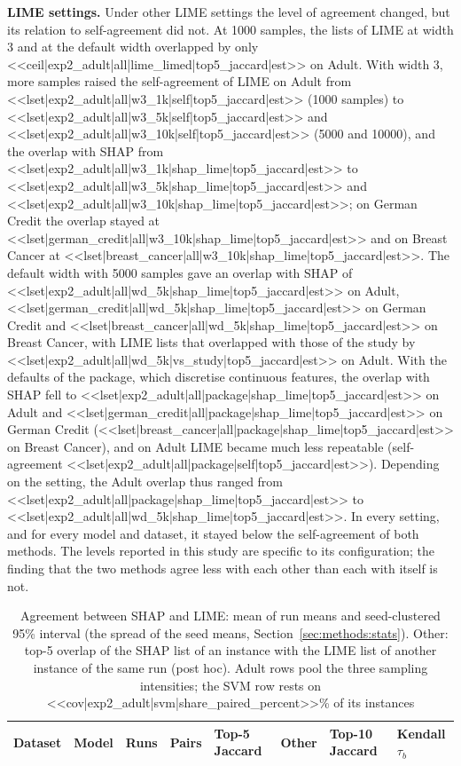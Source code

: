 \textbf{LIME settings.} Under other LIME settings the level of agreement changed, but its
relation to self-agreement did not. At 1000 samples, the lists of LIME at width 3 and at the
default width overlapped by only <<ceil|exp2_adult|all|lime_limed|top5_jaccard|est>> on
Adult. With width 3, more samples raised the self-agreement of LIME on Adult from
<<lset|exp2_adult|all|w3_1k|self|top5_jaccard|est>> (1000 samples) to
<<lset|exp2_adult|all|w3_5k|self|top5_jaccard|est>> and
<<lset|exp2_adult|all|w3_10k|self|top5_jaccard|est>> (5000 and 10000), and the overlap
with SHAP from <<lset|exp2_adult|all|w3_1k|shap_lime|top5_jaccard|est>> to
<<lset|exp2_adult|all|w3_5k|shap_lime|top5_jaccard|est>> and
<<lset|exp2_adult|all|w3_10k|shap_lime|top5_jaccard|est>>; on German Credit the overlap
stayed at <<lset|german_credit|all|w3_10k|shap_lime|top5_jaccard|est>> and on Breast Cancer
at <<lset|breast_cancer|all|w3_10k|shap_lime|top5_jaccard|est>>. The default width with
5000 samples gave an overlap with SHAP of
<<lset|exp2_adult|all|wd_5k|shap_lime|top5_jaccard|est>> on Adult,
<<lset|german_credit|all|wd_5k|shap_lime|top5_jaccard|est>> on German Credit and
<<lset|breast_cancer|all|wd_5k|shap_lime|top5_jaccard|est>> on Breast Cancer, with LIME
lists that overlapped with those of the study by
<<lset|exp2_adult|all|wd_5k|vs_study|top5_jaccard|est>> on Adult. With the defaults of the
package, which discretise continuous features, the overlap with SHAP fell to
<<lset|exp2_adult|all|package|shap_lime|top5_jaccard|est>> on Adult and
<<lset|german_credit|all|package|shap_lime|top5_jaccard|est>> on German Credit
(<<lset|breast_cancer|all|package|shap_lime|top5_jaccard|est>> on Breast Cancer), and on
Adult LIME became much less repeatable (self-agreement
<<lset|exp2_adult|all|package|self|top5_jaccard|est>>). Depending on the setting, the
Adult overlap thus ranged from <<lset|exp2_adult|all|package|shap_lime|top5_jaccard|est>>
to <<lset|exp2_adult|all|wd_5k|shap_lime|top5_jaccard|est>>. In every setting, and for
every model and dataset, it stayed below the self-agreement of both methods. The levels
reported in this study are specific to its configuration; the finding that the two methods
agree less with each other than each with itself is not.


\begin{table}[t]
\renewcommand{\arraystretch}{\tablestretch}
\centering
\caption{Agreement between SHAP and LIME: mean of run means and seed-clustered 95\% interval (the spread of the seed means, Section~\ref{sec:methods:stats}). Other: top-5 overlap of the SHAP list of an instance with the LIME list of another instance of the same run (post hoc). Adult rows pool the three sampling intensities; the SVM row rests on <<cov|exp2_adult|svm|share_paired_percent>>\% of its instances}
\label{tab:agreement}
\small
\setlength{\tabcolsep}{\mediumcolsep}
\begin{tabular}{llrrlrll}
\hline
Dataset & Model & Runs & Pairs & Top-5 Jaccard & Other & Top-10 Jaccard & Kendall $\tau_b$ \\
\hline

\end{tabular}
\end{table}

